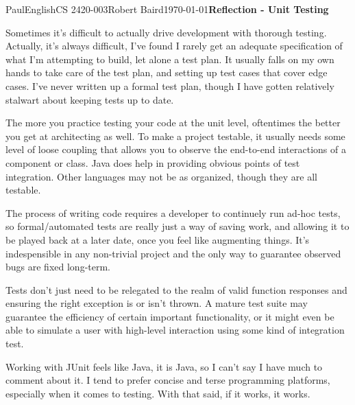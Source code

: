 \documentclass[12pt,letterpaper]{article}
\begin{document}
\begin{mla}{Paul}{English}{CS 2420-003}{Robert Baird}{\today}{\textbf{Reflection - Unit Testing}}

Sometimes it's difficult to actually drive development with thorough
testing. Actually, it's always difficult, I've found I rarely get an
adequate specification of what I'm attempting to build, let alone a
test plan. It usually falls on my own hands to take care of the test
plan, and setting up test cases that cover edge cases. I've never
written up a formal test plan, though I have gotten relatively
stalwart about keeping tests up to date.

The more you practice testing your code at the unit level, oftentimes
the better you get at architecting as well. To make a project
testable, it usually needs some level of loose coupling that allows
you to observe the end-to-end interactions of a component or class.
Java does help in providing obvious points of test integration. Other
languages may not be as organized, though they are all testable.

The process of writing code requires a developer to continuely run
ad-hoc tests, so formal/automated tests are really just a way of
saving work, and allowing it to be played back at a later date, once
you feel like augmenting things. It's indespensible in any non-trivial
project and the only way to guarantee observed bugs are fixed
long-term.

Tests don't just need to be relegated to the realm of valid function
responses and ensuring the right exception is or isn't thrown. A
mature test suite may guarantee the efficiency of certain important
functionality, or it might even be able to simulate a user with
high-level interaction using some kind of integration test.

Working with JUnit feels like Java, it is Java, so I can't say I have
much to comment about it. I tend to prefer concise and terse
programming platforms, especially when it comes to testing. With that
said, if it works, it works.

\end{mla}
\end{document}
